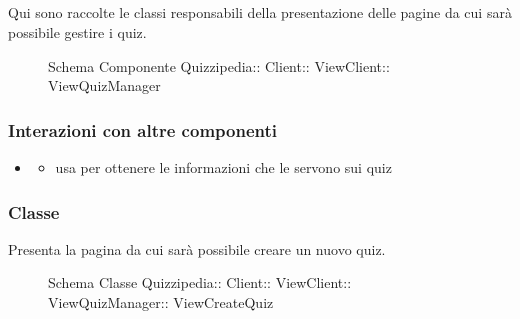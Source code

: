 \subsection{}
Qui sono raccolte le classi responsabili della presentazione delle pagine da cui sarà possibile gestire i quiz.
\begin{figure}[H]
\centering
\noindent{}
\caption[Schema Componente ViewQuizManager]{Schema Componente Quizzipedia:: Client:: ViewClient:: ViewQuizManager}
\end{figure}
\subsubsection{Interazioni con altre componenti}
\begin{itemize}
\item {}
\begin{itemize}
\item usa  per ottenere le informazioni che le servono sui quiz
\end{itemize}
\end{itemize}
\subsubsection{Classe }
Presenta la pagina da cui sarà possibile creare un nuovo quiz.
\begin{figure}[H]
\centering
\noindent{}
\caption[Schema Classe ViewCreateQuiz]{Schema Classe Quizzipedia:: Client:: ViewClient:: ViewQuizManager:: ViewCreateQuiz}
\end{figure}
